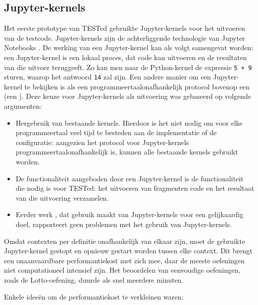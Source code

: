 \subsection{Jupyter-kernels}\label{subsec:jupyter-kernels}

Het eerste prototype van TESTed gebruikte Jupyter-kernels voor het uitvoeren van de testcode.
Jupyter-kernels zijn de achterliggende technologie van Jupyter Notebooks \autocite{jupyter2016}.
De werking van een Jupyter-kernel kan als volgt samengevat worden: een Jupyter-kernel is een lokaal proces, dat code kan uitvoeren en de resultaten van die uitvoer teruggeeft.
Zo kan men naar de Python-kernel de expressie \texttt{5 + 9} sturen, waarop het antwoord \texttt{14} zal zijn.
Een andere manier om een Jupyter-kernel te bekijken is als een programmeertaalonafhankelijk protocol bovenop een  (een ).
Deze keuze voor Jupyter-kernels als uitvoering was gebaseerd op volgende argumenten:
\begin{itemize}
    \item Hergebruik van bestaande kernels.
    Hierdoor is het niet nodig om voor elke programmeertaal veel tijd te besteden aan de implementatie of de configuratie: aangezien het protocol voor Jupyter-kernels programmeertaalonafhankelijk is, kunnen alle bestaande kernels gebruikt worden.
    \item De functionaliteit aangeboden door een Jupyter-kernel is de functionaliteit die nodig is voor TESTed: het uitvoeren van fragmenten code en het resultaat van die uitvoering verzamelen.
    \item Eerder werk \autocite{petegem2018}, dat gebruik maakt van Jupyter-kernels voor een gelijkaardig doel, rapporteert geen problemen met het gebruik van Jupyter-kernels.
\end{itemize}

Omdat contexten per definitie onafhankelijk van elkaar zijn, moet de gebruikte Jupyter-kernel gestopt en opnieuw gestart worden tussen elke context.
Dit brengt een onaanvaardbare performantiekost met zich mee, daar de meeste oefeningen niet computationeel intensief zijn.
Het beoordelen van eenvoudige oefeningen, zoals de Lotto-oefening, duurde als snel meerdere minuten.

Enkele ideeën om de performantiekost te verkleinen waren:

